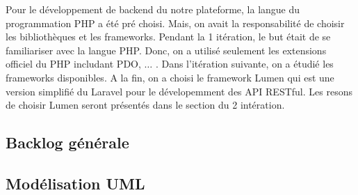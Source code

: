 Pour le développement de backend du notre plateforme, la langue du programmation
PHP a été pré choisi. Mais, on avait la responsabilité de choisir les
bibliothèques et les frameworks. Pendant la 1\iere{} itération, le but était de
se familiariser avec la langue PHP. Donc, on a utilisé seulement les extensions
officiel du PHP includant PDO, $\dotsc$ . Dans l'itération suivante, on a étudié
les frameworks disponibles. A la fin, on a choisi le framework Lumen qui est
une version simplifié du Laravel pour le dévelopemment des API RESTful. Les
resons de choisir Lumen seront présentés dans le section du 2\ieme{} intération.

\subsection{Backlog générale}



\subsection{Modélisation UML}
